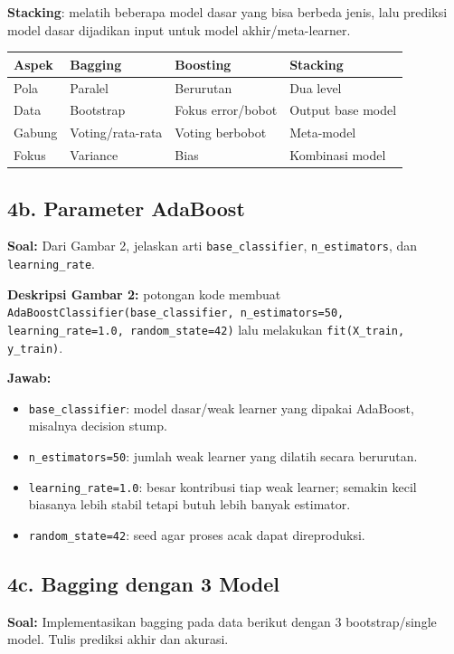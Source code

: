 \documentclass[10pt,a4paper,twocolumn]{article}
\newcommand{\jawab}{\textbf{Jawab: }}
\newcommand{\soal}{\textbf{Soal: }}
\begin{document}
\textbf{Stacking}: melatih beberapa model dasar yang bisa berbeda jenis, lalu prediksi model dasar dijadikan input untuk model akhir/meta-learner.

\begin{center}
\scriptsize
\begin{tabular}{@{}p{1.2cm}p{1.55cm}p{1.6cm}p{1.6cm}@{}}
\toprule
Aspek & Bagging & Boosting & Stacking \\
\midrule
Pola & Paralel & Berurutan & Dua level \\
Data & Bootstrap & Fokus error/bobot & Output base model \\
Gabung & Voting/rata-rata & Voting berbobot & Meta-model \\
Fokus & Variance & Bias & Kombinasi model \\
\bottomrule
\end{tabular}
\end{center}

\subsection*{4b. Parameter AdaBoost}
\soal Dari Gambar 2, jelaskan arti \texttt{base\_classifier}, \texttt{n\_estimators}, dan \texttt{learning\_rate}.

\textbf{Deskripsi Gambar 2:} potongan kode membuat \texttt{AdaBoostClassifier(base\_classifier, n\_estimators=50, learning\_rate=1.0, random\_state=42)} lalu melakukan \texttt{fit(X\_train, y\_train)}.

\jawab
\begin{itemize}
\item \texttt{base\_classifier}: model dasar/weak learner yang dipakai AdaBoost, misalnya decision stump.
\item \texttt{n\_estimators=50}: jumlah weak learner yang dilatih secara berurutan.
\item \texttt{learning\_rate=1.0}: besar kontribusi tiap weak learner; semakin kecil biasanya lebih stabil tetapi butuh lebih banyak estimator.
\item \texttt{random\_state=42}: seed agar proses acak dapat direproduksi.
\end{itemize}

\subsection*{4c. Bagging dengan 3 Model}
\soal Implementasikan bagging pada data berikut dengan 3 bootstrap/single model. Tulis prediksi akhir dan akurasi.
\end{document}
